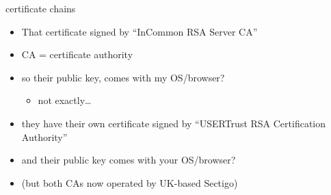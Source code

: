 \begin{frame}{certificate chains}
    \begin{itemize}
    \item That certificate signed by ``InCommon RSA Server CA''
    \item CA = certificate authority
    \vspace{.5cm}
    \item so their public key, comes with my OS/browser?
        \begin{itemize}
        \item not exactly\ldots
        \end{itemize}
    \item they have their own certificate signed by ``USERTrust RSA Certification Authority''
    \item and their public key comes with your OS/browser?
    \vspace{.5cm}
    \item (but both CAs now operated by UK-based Sectigo)
    \end{itemize}
\end{frame}
\usetikzlibrary{fit}
